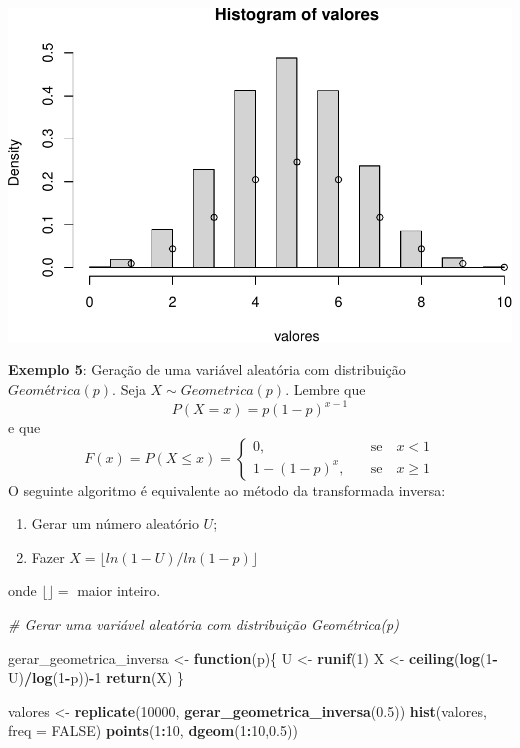 \documentclass[
]{book}
\newenvironment{Shaded}{\begin{snugshade}}{\end{snugshade}}
\newcommand{\AttributeTok}[1]{\textcolor[rgb]{0.13,0.29,0.53}{#1}}
\newcommand{\CommentTok}[1]{\textcolor[rgb]{0.56,0.35,0.01}{\textit{#1}}}
\newcommand{\ConstantTok}[1]{\textcolor[rgb]{0.56,0.35,0.01}{#1}}
\newcommand{\ControlFlowTok}[1]{\textcolor[rgb]{0.13,0.29,0.53}{\textbf{#1}}}
\newcommand{\DecValTok}[1]{\textcolor[rgb]{0.00,0.00,0.81}{#1}}
\newcommand{\FloatTok}[1]{\textcolor[rgb]{0.00,0.00,0.81}{#1}}
\newcommand{\FunctionTok}[1]{\textcolor[rgb]{0.13,0.29,0.53}{\textbf{#1}}}
\newcommand{\NormalTok}[1]{#1}
\newcommand{\OtherTok}[1]{\textcolor[rgb]{0.56,0.35,0.01}{#1}}
\newcommand{\SpecialCharTok}[1]{\textcolor[rgb]{0.81,0.36,0.00}{\textbf{#1}}}
\begin{document}
\includegraphics{introR_files/figure-latex/unnamed-chunk-288-1.pdf}

\textbf{Exemplo 5}: Geração de uma variável aleatória com distribuição
\(Geométrica(p)\). Seja \(X\sim Geometrica(p)\). Lembre que
\[P(X=x)=p(1-p)^{x-1}\] e que
\[F(x) = P(X\leq x) = \begin{cases} 0,& \quad \text{se} \quad x<1 \\
1-(1-p)^x,& \quad \text{se} \quad x\geq 1\end{cases}\] O seguinte
algoritmo é equivalente ao método da transformada inversa:

\begin{enumerate}
\def\labelenumi{\arabic{enumi}.}
\item
  Gerar um número aleatório \(U\);
\item
  Fazer \(X = \lfloor ln(1-U)/ln(1-p)\rfloor\)
\end{enumerate}

onde \(\lfloor  \rfloor =\) maior inteiro.

\begin{Shaded}
\begin{Highlighting}[]
\CommentTok{\# Gerar uma variável aleatória com distribuição Geométrica(p)}

\NormalTok{gerar\_geometrica\_inversa }\OtherTok{\textless{}{-}} \ControlFlowTok{function}\NormalTok{(p)\{}
\NormalTok{  U }\OtherTok{\textless{}{-}} \FunctionTok{runif}\NormalTok{(}\DecValTok{1}\NormalTok{)}
\NormalTok{  X }\OtherTok{\textless{}{-}} \FunctionTok{ceiling}\NormalTok{(}\FunctionTok{log}\NormalTok{(}\DecValTok{1}\SpecialCharTok{{-}}\NormalTok{U)}\SpecialCharTok{/}\FunctionTok{log}\NormalTok{(}\DecValTok{1}\SpecialCharTok{{-}}\NormalTok{p))}\SpecialCharTok{{-}}\DecValTok{1}
  \FunctionTok{return}\NormalTok{(X)}
\NormalTok{\}}

\NormalTok{valores }\OtherTok{\textless{}{-}} \FunctionTok{replicate}\NormalTok{(}\DecValTok{10000}\NormalTok{, }\FunctionTok{gerar\_geometrica\_inversa}\NormalTok{(}\FloatTok{0.5}\NormalTok{))}
\FunctionTok{hist}\NormalTok{(valores, }\AttributeTok{freq =} \ConstantTok{FALSE}\NormalTok{)}
\FunctionTok{points}\NormalTok{(}\DecValTok{1}\SpecialCharTok{:}\DecValTok{10}\NormalTok{, }\FunctionTok{dgeom}\NormalTok{(}\DecValTok{1}\SpecialCharTok{:}\DecValTok{10}\NormalTok{,}\FloatTok{0.5}\NormalTok{))}
\end{Highlighting}
\end{Shaded}
\end{document}

